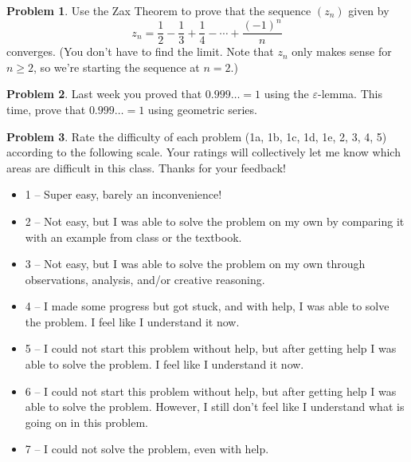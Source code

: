 \documentclass[11pt,oneside]{amsart}
\theoremstyle{definition}
\newtheorem{problem}{Problem}
\theoremstyle{plain}
\newcommand{\eps}{\varepsilon}
\begin{document}
    \begin{problem}
        Use the Zax Theorem to prove that the sequence $(z_n)$ given by 
        \[z_n=\frac{1}{2}-\frac{1}{3}+\frac{1}{4}-\cdots+\frac{(-1)^n}{n}
        \] 
        converges. (You don't have to find the limit. Note that $z_n$ only makes sense for $n\geq 2$, so we're starting the sequence at $n=2$.) 
    \end{problem}

    \begin{problem}
        Last week you proved that $0.999\ldots=1$ using the $\eps$-lemma. This time, prove that $0.999\ldots=1$ using geometric series.
    \end{problem}

    \begin{problem}
        Rate the difficulty of each problem (1a, 1b, 1c, 1d, 1e, 2, 3, 4, 5) according to the following scale. Your ratings will collectively let me know which areas are difficult in this class. Thanks for your feedback!
        \begin{itemize}
            \item 1 -- Super easy, barely an inconvenience!
            \item 2 -- Not easy, but I was able to solve the problem on my own by comparing it with an example from class or the textbook.
            \item 3 -- Not easy, but I was able to solve the problem on my own through observations, analysis, and/or creative reasoning.
            \item 4 -- I made some progress but got stuck, and with help, I was able to solve the problem. I feel like I understand it now.
            \item 5 -- I could not start this problem without help, but after getting help I was able to solve the problem. I feel like I understand it now.
            \item 6 -- I could not start this problem without help, but after getting help I was able to solve the problem. However, I still don't feel like I understand what is going on in this problem.
            \item 7 -- I could not solve the problem, even with help.
        \end{itemize}
    \end{problem}
\end{document}
